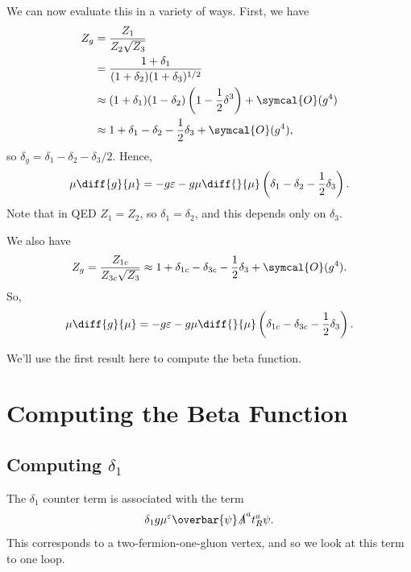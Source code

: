 \documentclass[fleqn]{NotesClass}
\newcommand{\diracadjoint}[1]{\overbar{#1}}
\newcommand{\order}{\symcal{O}}
\begin{document}
    We can now evaluate this in a variety of ways.
    First, we have
    \begin{align}
       Z_g &= \frac{Z_1}{Z_2\sqrt{Z_3}}\\
       &= \frac{1 + \delta_1}{(1 + \delta_2)(1 + \delta_3)^{1/2}}\\
       &\approx (1 + \delta_1)(1 - \delta_2)\left( 1 - \frac{1}{2}\delta^3 \right) + \order(g^4)\\
       &\approx 1 + \delta_1 - \delta_2 - \frac{1}{2}\delta_3 + \order(g^4),
    \end{align}
    so \(\delta_g = \delta_1 - \delta_2 - \delta_3/2\).
    Hence,
    \begin{equation}\label{eqn:YM beta function}
        \mu\diff{g}{\mu} = -g\varepsilon - g\mu\diff{}{\mu} \left( \delta_1 - \delta_2 - \frac{1}{2}\delta_3 \right).
    \end{equation}
    Note that in QED \(Z_1 = Z_2\), so \(\delta_1 = \delta_2\), and this depends only on \(\delta_3\).
    
    We also have
    \begin{equation}
        Z_g = \frac{Z_{1c}}{Z_{3c}\sqrt{Z_3}} \approx 1 + \delta_{1c} - \delta_{3c} - \frac{1}{2}\delta_3 + \order(g^4).
    \end{equation}
    So,
    \begin{equation}
        \mu\diff{g}{\mu} = -g\varepsilon - g\mu\diff{}{\mu} \left( \delta_{1c} - \delta_{3c} - \frac{1}{2}\delta_3 \right).
    \end{equation}
    
    We'll use the first result here to compute the beta function.
    
    \section{Computing the Beta Function}
    \subsection{Computing \texorpdfstring{\(\delta_1\)}{delta 1}}
    The \(\delta_1\) counter term is associated with the term
    \begin{equation}
        \delta_1 g\mu^\varepsilon \diracadjoint{\psi} \slashed{A}^a t_R^a \psi.
    \end{equation}
    This corresponds to a two-fermion-one-gluon vertex, and so we look at this term to one loop.
    
\end{document}
